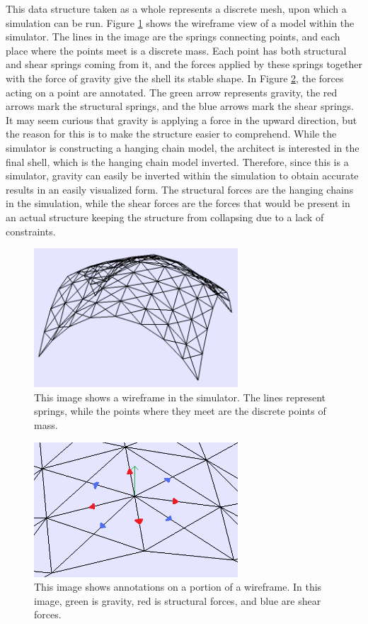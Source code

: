\documentclass{thesis}
\begin{document}
This data structure taken as a whole represents a discrete mesh, upon which a simulation can be run.  Figure \ref{fig:wireframe} shows
the wireframe view of a model within the simulator.  The lines in the image are the springs connecting points, and each place where
the points meet is a discrete mass.  Each point has both structural and shear springs coming from it, and the forces applied by these
springs together with the force of gravity give the shell its stable shape.  In Figure \ref{fig:wireframe_detail}, the forces acting on
a point are annotated.  The green arrow represents gravity, the red arrows mark the structural springs, and the blue arrows mark the
shear springs.  It may seem curious that gravity is applying a force in the upward direction, but the reason for this is to make the
structure easier to comprehend.  While the simulator is constructing a hanging chain model, the architect is interested in the final
shell, which is the hanging chain model inverted.  Therefore, since this is a simulator, gravity can easily be inverted within the
simulation to obtain accurate results in an easily visualized form.  The structural forces are the hanging chains in the simulation,
while the shear forces are the forces that would be present in an actual structure keeping the structure from collapsing due to a lack
of constraints.

\begin{figure}
\centering
\includegraphics[width=3in]{images/wireframe.png}
\caption[A wireframe of a simulated model]{This image shows a wireframe in the simulator.  The lines represent springs, while the points
where they meet are the discrete points of mass.}
\label{fig:wireframe}
\end{figure}

\begin{figure}
\centering
\includegraphics[width=3in]{images/wireframe_detail.png}
\caption[Detail of a wireframe of a simulated model]{This image shows annotations on a portion of a wireframe.  In this image, green is
gravity, red is structural forces, and blue are shear forces.}
\label{fig:wireframe_detail}
\end{figure}
\end{document}
